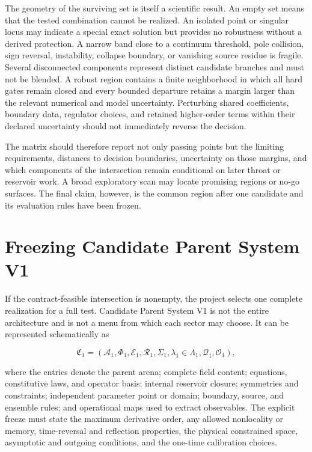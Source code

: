 The geometry of the surviving set is itself a scientific result. An empty set
means that the tested combination cannot be realized. An isolated point or
singular locus may indicate a special exact solution but provides no robustness
without a derived protection. A narrow band close to a continuum threshold,
pole collision, sign reversal, instability, collapse boundary, or vanishing
source residue is fragile. Several disconnected components represent distinct
candidate branches and must not be blended. A robust region contains a finite
neighborhood in which all hard gates remain closed and every bounded departure
retains a margin larger than the relevant numerical and model uncertainty.
Perturbing shared coefficients, boundary data, regulator choices, and retained
higher-order terms within their declared uncertainty should not immediately
reverse the decision.

The matrix should therefore report not only passing points but the limiting
requirements, distances to decision boundaries, uncertainty on those margins,
and which components of the intersection remain conditional on later throat or
reservoir work. A broad exploratory scan may locate promising regions or no-go
surfaces. The final claim, however, is the common region after one candidate and
its evaluation rules have been frozen.

\section{Freezing Candidate Parent System V1}

If the contract-feasible intersection is nonempty, the project selects one
complete realization for a full test. Candidate Parent System V1 is not the
entire architecture and is not a menu from which each sector may choose. It can
be represented schematically as

\[
\boxed{
\mathfrak{C}_1
=
\left(
\mathcal A_1,
\Phi_1,
\mathcal E_1,
\mathcal R_1,
\Sigma_1,
\lambda_1\in\Lambda_1,
\mathcal Q_1,
\mathcal O_1
\right),
}
\]

where the entries denote the parent arena; complete field content; equations,
constitutive laws, and operator basis; internal reservoir closure; symmetries
and constraints; independent parameter point or domain; boundary, source, and
ensemble rules; and operational maps used to extract observables. The explicit
freeze must state the maximum derivative order, any allowed nonlocality or
memory, time-reversal and reflection properties, the physical constrained
space, asymptotic and outgoing conditions, and the one-time calibration choices.

